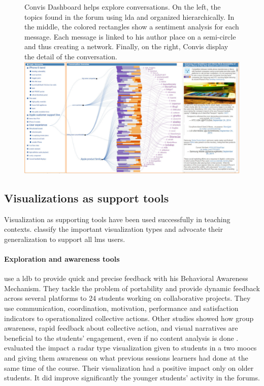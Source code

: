 \documentclass[a4paper,twoside]{article}
\begin{document}
\begin{figure}[b]
  \small{
    \caption{\label{fig:convis}
      Convis Dashboard \citep{Hoque2016} helps explore conversations.  On the left, the topics found in the forum using \gls{lda} and organized hierarchically.  In the middle, the colored rectangles show a sentiment analysis for each message. Each message is linked to his author place on a semi-circle and thus creating a network. Finally, on the right, Convis display the detail of the conversation.
  \centering
  \includegraphics[width=.5\textwidth]{images/convis.png}
    }}
\end{figure}

\subsection{Visualizations as support tools}

Visualization as supporting tools have been used successfully in teaching contexts. \cite{Heer2012} classify the important visualization types and \cite{Emmons2017,Leeuwen2014} advocate their generalization to support all \gls{lms} users.

\paragraph{Exploration and awareness tools}
\cite{Medina2016} use a \gls{ldb} to provide quick and precise feedback with his Behavioral Awareness Mechanism.  They tackle the problem of portability and provide dynamic feedback across several platforms to 24 students working on collaborative projects.  They use communication, coordination, motivation, performance and satisfaction indicators to operationalized collective actions.  Other studies showed how group awareness, rapid feedback about collective action, and visual narratives \citep{Yousuf2015} are beneficial to the students' engagement, even if no content analysis is done \citep{Davis2017,May2011,Medina2016}.
\cite{Davis2017} evaluated the impact a radar type visualization given to students in a two \glspl{mooc} and giving them awareness on what previous sessions learners had done at the same time of the course.  Their visualization had a positive impact only on older students.  It did improve significantly the younger students' activity in the forums.
\end{document}
